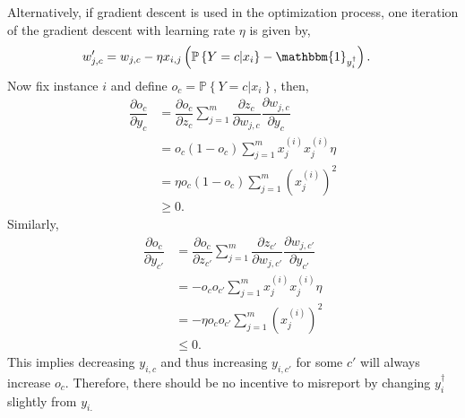 \documentclass{article}
\begin{document}
Alternatively, if gradient descent is used in the optimization process, one iteration of the gradient descent with learning rate $\eta$ is given by,
\begin{align*}
w'_{j,c} &= w_{j,c} - \eta x_{i,j} \left(\mathbb{P}\left\{Y = c | x_{i}\right\} - \mathbbm{1}_{y^{\dagger}_{i}}\right).
\end{align*}
Now fix instance $i $ and define $o_{c} = \mathbb{P}\left\{Y = c | x_{i}\right\}$, then,
\begin{align*}
\dfrac{\partial o_{c}}{\partial y_{c}} &= \dfrac{\partial o_{c}}{\partial z_{c}} \displaystyle\sum_{j=1}^{m} \dfrac{\partial z_{c}}{\partial w_{j,c}} \dfrac{\partial w_{j,c}}{\partial y_{c}}
\\ &= o_{c} \left(1 - o_{c}\right) \displaystyle\sum_{j=1}^{m} x_{j}^{\left(i\right)} x_{j}^{\left(i\right)} \eta
\\ &= \eta o_{c} \left(1 - o_{c}\right) \displaystyle\sum_{j=1}^{m} \left(x_{j}^{\left(i\right)}\right)^{2}
\\ &\geq  0.
\end{align*}
Similarly,
\begin{align*}
\dfrac{\partial o_{c}}{\partial y_{c'}} &= \dfrac{\partial o_{c}}{\partial z_{c'}} \displaystyle\sum_{j=1}^{m} \dfrac{\partial z_{c'}}{\partial w_{j,c'}} \dfrac{\partial w_{j,c'}}{\partial y_{c'}}
\\ &= - o_{c} o_{c'} \displaystyle\sum_{j=1}^{m} x_{j}^{\left(i\right)} x_{j}^{\left(i\right)} \eta
\\ &= - \eta o_{c} o_{c'} \displaystyle\sum_{j=1}^{m} \left(x_{j}^{\left(i\right)}\right)^{2}
\\ &\leq  0.
\end{align*}
This implies decreasing $y_{i,c}$ and thus increasing $y_{i,c'}$ for some $c'$ will always increase $o_{c}$. Therefore, there should be no incentive to misreport by changing $y^{\dagger}_{i}$ slightly from $y_{i.}$
\newline \newline
\end{document}
